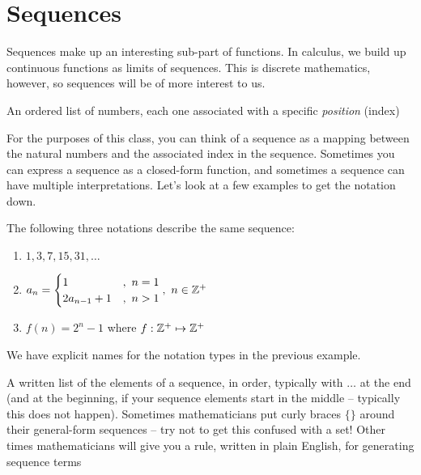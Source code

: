 \documentclass[main.tex]{subfiles}
\begin{document}
\section{Sequences}

Sequences make up an interesting sub-part of functions. In calculus, we build up continuous functions as limits of sequences. This is discrete mathematics, however, so sequences will be of more interest to us.

\begin{defn}
	An ordered list of numbers, each one associated with a specific \textit{position} (index)
\end{defn}

For the purposes of this class, you can think of a sequence as a mapping between the natural numbers and the associated index in the sequence. Sometimes you can express a sequence as a closed-form function, and sometimes a sequence can have multiple interpretations. Let's look at a few examples to get the notation down.

\begin{example}
	The following three notations describe the same sequence:
	
	\begin{enumerate}[label=(\alph*)]
		\item \(1, 3, 7, 15, 31, \dots\)
		\item \(a_n = \begin{cases} 1 &,\ n = 1 \\ 2a_{n-1} + 1 &,\ n > 1 \end{cases},\ n \in \mathbb{Z}^+\)
		\item \(f(n) = 2^n - 1\) where \(f : \mathbb{Z}^+ \mapsto \mathbb{Z}^+\)
	\end{enumerate}
\end{example}

We have explicit names for the notation types in the previous example.

\begin{defn}
	A written list of the elements of a sequence, in order, typically with \(\dots\) at the end (and at the beginning, if your sequence elements start in the middle -- typically this does not happen). Sometimes mathematicians put curly braces \(\{\}\) around their general-form sequences -- try not to get this confused with a set! Other times mathematicians will give you a rule, written in plain English, for generating sequence terms
\end{defn}
\end{document}
